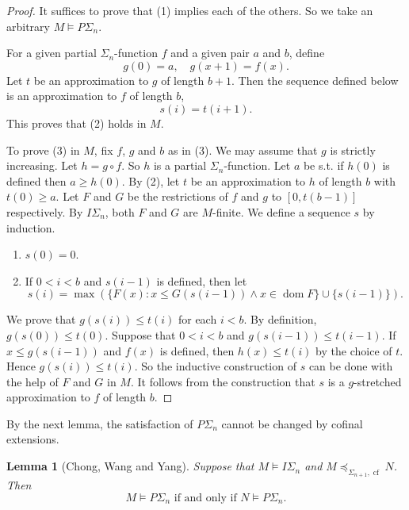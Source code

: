 \documentclass[twoside,a4paper]{amsart}
\newtheorem{lemma}[theorem]{Lemma}
\theoremstyle{definition}
\theoremstyle{theorem}
\numberwithin{equation}{section}
\newcommand{\<}{\langle}
\renewcommand{\>}{\rangle}
\newcommand{\dom}{\operatorname{dom}}
\begin{document}
\begin{proof}
It suffices to prove that (1) implies each of the others.
So we take an arbitrary $M \models P\Sigma_n$.

For a given partial $\Sigma_n$-function $f$ and a given pair $a$ and $b$,
 define
\[
  g(0) = a, \quad g(x+1) = f(x).
\]
Let $t$ be an approximation to $g$ of length $b+1$.
Then the sequence defined below is an approximation to $f$ of length $b$,
\[
  s(i) = t(i+1).
\]
This proves that (2) holds in $M$.

To prove (3) in $M$, fix $f$, $g$ and $b$ as in (3).
We may assume that $g$ is strictly increasing.
Let $h = g \circ f$. So $h$ is a partial $\Sigma_n$-function.
Let $a$ be s.t. if $h(0)$ is defined then $a \geq h(0)$.
By (2), let $t$ be an approximation to $h$ of length $b$ with $t(0) \geq a$.
Let $F$ and $G$ be the restrictions of $f$ and $g$ to $[0,t(b-1)]$ respectively.
By $I\Sigma_n$, both $F$ and $G$ are $M$-finite.
We define a sequence $s$ by induction.
\begin{enumerate}
 \item $s(0) = 0$.
 \item If $0 < i < b$ and $s(i-1)$ is defined, then let
\[
  s(i) = \max \left( \{F(x): x \leq G(s(i-1)) \wedge x \in \dom F\} \cup \{s(i-1)\} \right).
\]
\end{enumerate}
We prove that $g(s(i)) \leq t(i)$ for each $i < b$.
By definition, $g(s(0)) \leq t(0)$.
Suppose that $0 < i < b$ and $g(s(i-1)) \leq t(i-1)$.
If $x \leq g(s(i-1))$ and $f(x)$ is defined, then $h(x) \leq t(i)$ by the choice of $t$.
Hence $g(s(i)) \leq t(i)$.
So the inductive construction of $s$ can be done with the help of $F$ and $G$ in $M$.
It follows from the construction that $s$ is a $g$-stretched approximation to $f$ of length $b$.
\end{proof}

By the next lemma, the satisfaction of $P\Sigma_n$ cannot be changed by cofinal extensions. 

\begin{lemma}[Chong, Wang and Yang]\label{lem:Approx-Cof-ext}
Suppose that $M \models I\Sigma_n$ and $M \preceq_{\Sigma_{n+1}, \operatorname{cf}} N$.
Then
\[
  M \models P\Sigma_n \text{ if and only if } N \models P\Sigma_n.
\]
\end{lemma}
\end{document}
